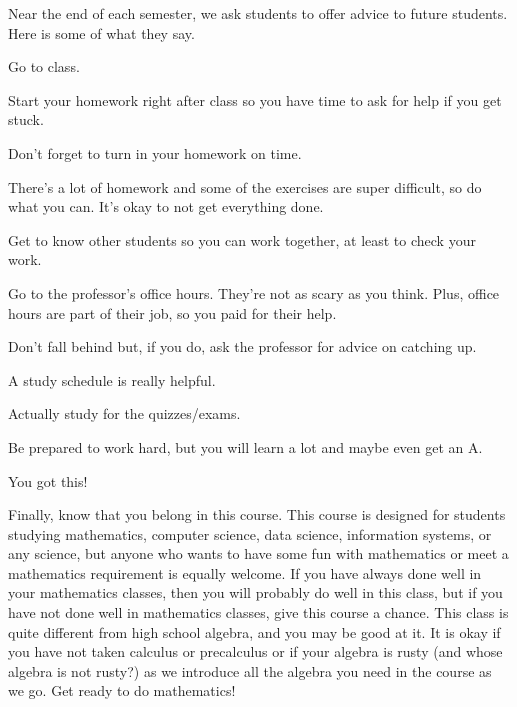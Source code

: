 Near the end of each semester, we ask students to offer advice to future students.  Here is some of what they say.

\begin{bull} %
    \item [\checkmark] Go to class.
    \item [\checkmark] Start your homework right after class so you have time to ask for help if you get stuck.
    \item [\checkmark] Don't forget to turn in your homework on time.
    \item [\checkmark] There's a lot of homework and some of the exercises are super difficult, so do what you can.  It's okay to not get everything done.
    \item [\checkmark] Get to know other students so you can work together, at least to check your work.
    \item [\checkmark] Go to the professor's office hours.  They're not as scary as you think. Plus, office hours are part of their job, so you paid for their help.
    \item [\checkmark] Don't fall behind but, if you do, ask the professor for advice on catching up.
    \item [\checkmark] A study schedule is really helpful.
    \item [\checkmark]Actually study for the quizzes/exams.
    \item [\checkmark] Be prepared to work hard, but you will learn a lot and maybe even get an A.
    \item [\checkmark] You got this!
\end{bull}

Finally, know that you belong in this course.  This course is designed for students studying mathematics, computer science, data science, information systems, or any science, but anyone who wants to have some fun with mathematics or meet a mathematics requirement is equally welcome. If you have always done well in your mathematics classes, then you will probably do well in this class, but if you have not done well in mathematics classes, give this course a chance. This class is quite different from high school algebra, and you may be good at it.  It is okay if you have not taken calculus or precalculus or if your algebra is rusty (and whose algebra is not rusty?) as we introduce all the algebra you need in the course as we go.  Get ready to do mathematics!  


